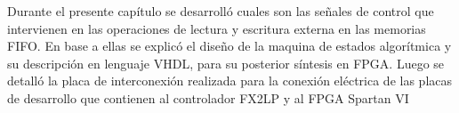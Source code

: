 Durante el presente capítulo se desarrolló cuales son las señales de control que intervienen en las operaciones de lectura y escritura externa en las memorias FIFO. En base a ellas se explicó el diseño de la maquina de estados algorítmica y su descripción en lenguaje VHDL, para su posterior síntesis en FPGA.
Luego se detalló la placa de interconexión realizada para la conexión eléctrica de las placas de desarrollo que contienen al controlador FX2LP y al FPGA Spartan VI
